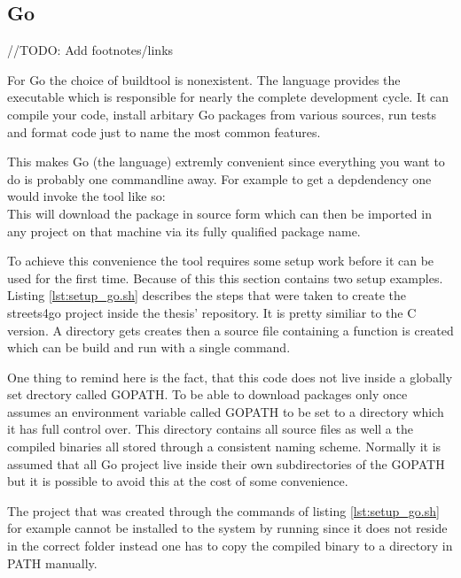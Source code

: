 \subsection{Go}
\label{subsec:Implementation::Setup::Go}

//TODO: Add footnotes/links

For Go the choice of buildtool is nonexistent. The language provides the  executable which is responsible for nearly the complete development cycle. It can compile your code, install arbitary Go packages from various sources, run tests and format code just to name the most common features.

This makes Go (the language) extremly convenient since everything you want to do is probably one commandline away. For example to get a depdendency one would invoke the tool like so:
\\
This will download the package in source form which can then be imported in any project on that machine via its fully qualified package name.

To achieve this convenience the  tool requires some setup work before it can be used for the first time. Because of this this section contains two setup examples.
\\


Listing \ref{lst:setup_go.sh} describes the steps that were taken to create the streets4go project inside the thesis' repository. It is pretty similiar to the C version. A directory gets creates then a source file containing a  function is created which can be build and run with a single command.

One thing to remind here is the fact, that this code does not live inside a globally set drectory called GOPATH. To be able to download packages only once  assumes an environment variable called GOPATH to be set to a directory which it has full control over. This directory contains all source files as well a the compiled binaries all stored through a consistent naming scheme. Normally it is assumed that all Go project live inside their own subdirectories of the GOPATH but it is possible to avoid this at the cost of some convenience.

The project that was created through the commands of listing \ref{lst:setup_go.sh} for example cannot be installed to the system by running  since it does not reside in the correct folder instead one has to copy the compiled binary to a directory in PATH manually.

